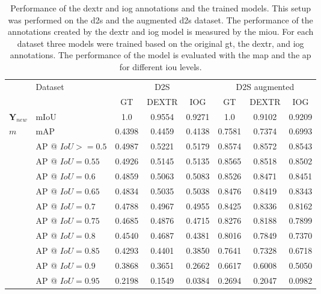 \begin{table}[h!]
	\centering
	\begin{tabular}{ ll|c c c|c c c}
		\toprule
								& Dataset				& \multicolumn{3}{c}{D2S} 			& \multicolumn{3}{c}{D2S augmented} \\		 
								& 						& GT		& DEXTR		& IOG		& GT		& DEXTR		& IOG		\\
		\midrule
		$ \textbf{Y}_{new} $ 	& mIoU 					& 1.0		& 0.9554	& 0.9271	& 1.0		& 0.9102	& 0.9209	\\
		\midrule
		$ m $					& mAP 					& 0.4398	& 0.4459	& 0.4138	& 0.7581	& 0.7374	& 0.6993	\\
		
								& AP @ $ IoU >= 0.5 $	& 0.4987	& 0.5221	& 0.5179	& 0.8574	& 0.8572	& 0.8543	\\
								& AP @ $ IoU = 0.55 $ 	& 0.4926	& 0.5145	& 0.5135	& 0.8565	& 0.8518	& 0.8502	\\
								& AP @ $ IoU = 0.6 $	& 0.4859	& 0.5063	& 0.5083	& 0.8526	& 0.8471	& 0.8451	\\
								& AP @ $ IoU = 0.65 $ 	& 0.4834	& 0.5035	& 0.5038	& 0.8476	& 0.8419	& 0.8343	\\
								& AP @ $ IoU = 0.7 $	& 0.4788	& 0.4967	& 0.4955	& 0.8425	& 0.8336	& 0.8162	\\
								& AP @ $ IoU = 0.75 $ 	& 0.4685	& 0.4876	& 0.4715	& 0.8276	& 0.8188	& 0.7899	\\
								& AP @ $ IoU = 0.8 $	& 0.4540	& 0.4687	& 0.4381	& 0.8016	& 0.7849	& 0.7370	\\
								& AP @ $ IoU = 0.85 $ 	& 0.4293	& 0.4401	& 0.3850	& 0.7641	& 0.7328	& 0.6718	\\
								& AP @ $ IoU = 0.9 $	& 0.3868	& 0.3651	& 0.2662	& 0.6617	& 0.6008	& 0.5050	\\
								& AP @ $ IoU = 0.95 $ 	& 0.2198	& 0.1549	& 0.0384	& 0.2694	& 0.2047	& 0.0982	\\
		\bottomrule
	\end{tabular}
	\caption[Performance of models trained with DEXTR and IOG annotations]{
		Performance of the \gls{dextr} and \gls{iog} annotations and the trained models.
		This setup was performed on the \gls{d2s} and the augmented \gls{d2s} dataset.
		The performance of the annotations created by the \gls{dextr} and \gls{iog} model is measured by the \gls{miou}.
		For each dataset three models were trained based on the original \gls{gt}, the \gls{dextr}, and \gls{iog} annotations.
		The performance of the model is evaluated with the \gls{map} and the \gls{ap} for different \gls{iou} levels.		
	}\label{tab:ch5:results_annot_usability}
\end{table}

